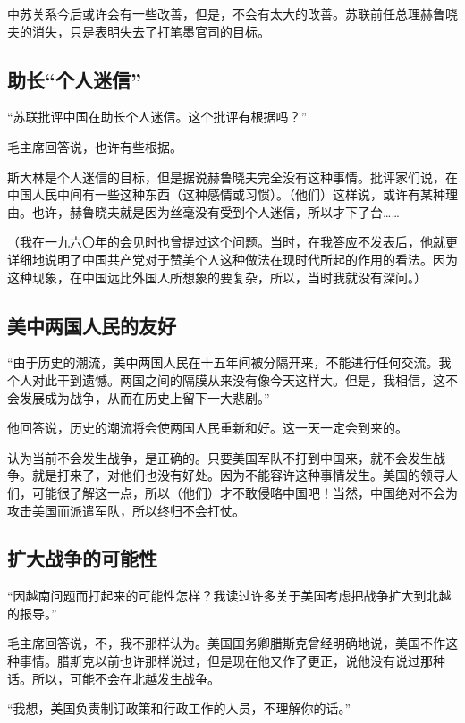 中苏关系今后或许会有一些改善，但是，不会有太大的改善。苏联前任总理赫鲁晓夫的消失，只是表明失去了打笔墨官司的目标。

\subsection{助长“个人迷信”}

“苏联批评中国在助长个人迷信。这个批评有根据吗？”

毛主席回答说，也许有些根据。

斯大林是个人迷信的目标，但是据说赫鲁晓夫完全没有这种事情。批评家们说，在中国人民中间有一些这种东西（这种感情或习惯）。（他们）这样说，或许有某种理由。也许，赫鲁晓夫就是因为丝毫没有受到个人迷信，所以才下了台……

（我在一九六〇年的会见时也曾提过这个问题。当时，在我答应不发表后，他就更详细地说明了中国共产党对于赞美个人这种做法在现时代所起的作用的看法。因为这种现象，在中国远比外国人所想象的要复杂，所以，当时我就没有深问。）

\subsection{美中两国人民的友好}

“由于历史的潮流，美中两国人民在十五年间被分隔开来，不能进行任何交流。我个人对此干到遗憾。两国之间的隔膜从来没有像今天这样大。但是，我相信，这不会发展成为战争，从而在历史上留下一大悲剧。”

他回答说，历史的潮流将会使两国人民重新和好。这一天一定会到来的。

认为当前不会发生战争，是正确的。只要美国军队不打到中国来，就不会发生战争。就是打来了，对他们也没有好处。因为不能容许这种事情发生。美国的领导人们，可能很了解这一点，所以（他们）才不敢侵略中国吧！当然，中国绝对不会为攻击美国而派遣军队，所以终归不会打仗。

\subsection{扩大战争的可能性}

“因越南问题而打起来的可能性怎样？我读过许多关于美国考虑把战争扩大到北越的报导。”

毛主席回答说，不，我不那样认为。美国国务卿腊斯克曾经明确地说，美国不作这种事情。腊斯克以前也许那样说过，但是现在他又作了更正，说他没有说过那种话。所以，可能不会在北越发生战争。

“我想，美国负责制订政策和行政工作的人员，不理解你的话。”

